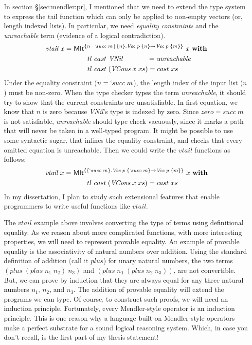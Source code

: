In section \S\ref{sec:mendler:pr}, I mentioned that we 
need to extend the type system to express the tail function which can only 
be applied to non-empty vectors (or, length indexed lists).
In particular, we need \emph{equality constraints} and
the \emph{unreachable} term (evidence of a logical contradiction).
\begin{align*}
\textit{vtail}~x =~& \textsf{MIt}^{\{ n=`succ\;m \,|\, \{n\}. \textit{Vec}\;p\;\{n\} -> \textit{Vec}\;p\;\{m\}\}}~x~\textbf{with}\\
&\qquad  tl ~cast~\textit{VNil}~~~~~~~~~~~ = \textit{unreachable} \\
&\qquad  tl ~cast\;(\textit{VCons}\;x\;xs) = cast\;xs
\end{align*}
Under the equality constraint ($n=`succ\;m$), the length index of
the input list ($n$) must be non-zero. When the type checker types
the term \textit{unreachable}, it should try to show that the current constraints
are unsatisfiable. In first equation, we know that $n$ is zero because
\textit{VNil}'s type is indexed by zero. Since $zero=succ\;m$ is not
satisfiable, \textit{unreachable} should type check vacuously, since it marks a path
that will never be taken in a well-typed program. It might be possible
to use some syntactic sugar, that inlines the equality constraint, and
checks that every omitted equation is unreachable. Then we could write the
$vtail$ functions as follows:
\begin{align*}
\textit{vtail}~x =~& \textsf{MIt}^{\{ \{`succ\;m\}. \textit{Vec}\;p\;\{`succ\;m\} -> \textit{Vec}\;p\;\{m\}\}}~x~\textbf{with}\\
&\qquad  tl ~cast\;(\textit{VCons}\;x\;xs) = cast\;xs
\end{align*}
In my dissertation, I plan to study such extensional features that enable
programmers to write useful functions like $vtail$.

The $vtail$ example above involves converting the type of terms using definitional equality.
As we reason about more complicated functions, with more interesting properties,
we will need to represent provable equality. An example of provable
equality is the associativity of natural numbers over addition. 
Using the standard definition of addition (call it $plus$) for unary natural numbers,
the two terms
$(plus\;(plus\;n_1\;n_2)\;n_3)$ and $(plus\;n_1\;(plus\;n_2\;n_3))$,
are not convertible. But, we can prove by induction that they are always equal
for any three natural numbers $n_1$, $n_2$, and $n_3$. The addition of
provable equality will extend the programs we can type. Of course, to construct such
proofs, we will need an induction principle. Fortunately, every Mendler-style operator
is an induction principle. This is one reason why a language built on Mendler-style
operators make a perfect substrate for a sound logical reasoning system. Which, in case
you don't recall, is the first part of my thesis statement!

